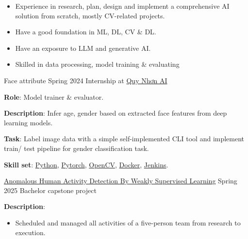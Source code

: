 \documentclass{src/preamble/doc_class}
\begin{document}
	\begin{MainPart}
		
		\Specialty
		{
			\begin{itemize}[label=$\bullet$,topsep=-.5ex,itemsep=-0.5ex]
				\item Experience in research, plan, design and implement a comprehensive AI solution from scratch, mostly CV-related projects.
				\item Have a good foundation in ML, DL, CV \& DL.
				\item Have an exposure to LLM and generative AI.
				\item Skilled in data processing, model training \& evaluating
			\end{itemize}
		}
		
        \Experience
        {\ColorHighlight}
        {Face attribute}
        {Spring 2024}
        {Internship at \href{https://qaidora.com/}{Quy Nhơn AI}}
        {
            \textbf{Role}: Model trainer \& evaluator.\\
            \vspace{.15cm}

            \textbf{Description}: Infer age, gender based on extracted face features from deep learning models.
            \vspace{.15cm}
            
            \textbf{Task}: Label image data with a simple self-implemented CLI tool and implement train/ test pipeline for gender classification task.\\
            \vspace{.15cm}

            \textbf{Skill set}: \href{https://www.python.org/}{Python}, \href{https://pytorch.org/}{Pytorch}, \href{https://opencv.org/}{OpenCV}, \href{https://www.docker.com/}{Docker}, \href{https://www.jenkins.io/}{Jenkins}.
        }

        \Experience
        {\ColorHighlight}
        {\href{https://github.com/diligent-man/Video_Anomaly_Detection}{Anomalous Human Activity Detection By Weakly Supervised Learning}}
        {Spring 2025}
        {Bachelor capstone project}
        {
            \textbf{Description}:
            \begin{itemize}[label=$\bullet$,topsep=-.5ex,itemsep=-0.5ex]
            	\item Scheduled and managed all activities of a five-person team from research to execution.
            	

\end{itemize}}
\end{MainPart}
\end{document}
